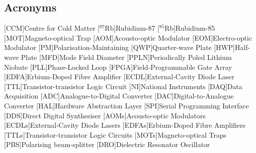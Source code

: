 \begin{appendices}
\chapter*{Acronyms}
    \begin{acronym}
        [CCM]{Centre for Cold Matter}
        [\(^{87}\)Rb]{Rubidium-87}
        [\(^{85}\)Rb]{Rubidium-85}
        [MOT]{Magneto-optical Trap}
        [AOM]{Acousto-optic Modulator}
        [EOM]{Electro-optic Modulator}
        [PM]{Polarisation-Maintaining}
        [QWP]{Quarter-wave Plate}
        [HWP]{Half-wave Plate}
        [MFD]{Mode Field Diameter}
        [PPLN]{Periodically Poled Lithium Niobate}
        [PLL]{Phase-Locked Loop}
        [FPGA]{Field-Programmable Gate Array}
        [EDFA]{Erbium-Doped Fibre Amplifier}
        [ECDL]{External-Cavity Diode Laser}
        [TTL]{Transistor-transistor Logic Circuit}
        [NI]{National Instruments}
        [DAQ]{Data Acquisition}
        [ADC]{Analogue-to-Digital Converter}
        [DAC]{Digital-to-Analogue Converter}
        [HAL]{Hardware Abstraction Layer}
        [SPI]{Serial Programming Interface}
        [DDS]{Direct Digital Synthesiser}
        [AOMs]{Acousto-optic Modulators}
        [ECDLs]{External-Cavity Diode Lasers}
        [EDFAs]{Erbium-Doped Fibre Amplifiers}
        [TTLs]{Transistor-transistor Logic Circuits}
        [MOTs]{Magneto-optical Traps}
        [PBS]{Polarising beam-splitter}
        [DRO]{Dielectric Resonator Oscillator}
    \end{acronym}
\end{appendices}